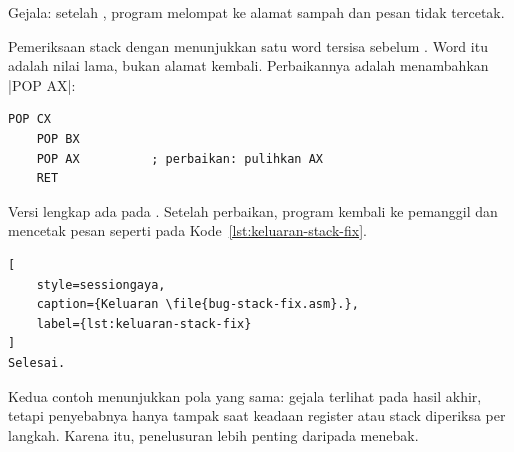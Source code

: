 Gejala: setelah , program melompat ke alamat sampah
dan pesan  tidak tercetak.

Pemeriksaan stack dengan  menunjukkan satu word tersisa
sebelum . Word itu adalah nilai  lama, bukan alamat
kembali. Perbaikannya adalah menambahkan \lstasm|POP AX|:

\begin{lstlisting}[language=MASM, numbers=none]
    POP CX
    POP BX
    POP AX          ; perbaikan: pulihkan AX
    RET
\end{lstlisting}

Versi lengkap ada pada . Setelah perbaikan,
program kembali ke pemanggil dan mencetak pesan seperti pada
Kode~\ref{lst:keluaran-stack-fix}.

\begin{lstlisting}[
    style=sessiongaya,
    caption={Keluaran \file{bug-stack-fix.asm}.},
    label={lst:keluaran-stack-fix}
]
Selesai.
\end{lstlisting}

\begin{infobox}
\vspace{1.1em}
Kedua contoh menunjukkan pola yang sama: gejala terlihat pada hasil
akhir, tetapi penyebabnya hanya tampak saat keadaan register atau
stack diperiksa per langkah. Karena itu, penelusuran lebih penting
daripada menebak.
\end{infobox}
